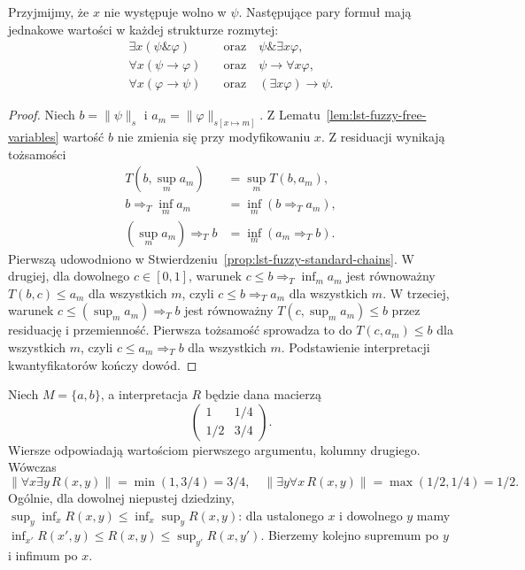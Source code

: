 \begin{stwierdzenie}
\label{prop:lst-fuzzy-quantifier-laws}
Przyjmijmy, że $x$ nie występuje wolno w $\psi$.
Następujące pary formuł mają jednakowe wartości
w każdej strukturze rozmytej:
\begin{align*}
 \exists x(\psi\mathbin{\&}\varphi)
 &\quad\text{oraz}\quad \psi\mathbin{\&}\exists x\varphi,\\
 \forall x(\psi\to\varphi)
 &\quad\text{oraz}\quad \psi\to\forall x\varphi,\\
 \forall x(\varphi\to\psi)
 &\quad\text{oraz}\quad (\exists x\varphi)\to\psi.
\end{align*}
\end{stwierdzenie}
\begin{proof}
Niech $b=\|\psi\|_s$ i $a_m=\|\varphi\|_{s[x\mapsto m]}$.
Z Lematu~\ref{lem:lst-fuzzy-free-variables} wartość $b$
nie zmienia się przy modyfikowaniu $x$. Z residuacji
wynikają tożsamości
\[
\begin{split}
 T(b,\sup_m a_m)&=\sup_m T(b,a_m),\\
 b\Rightarrow_T\inf_m a_m&=\inf_m(b\Rightarrow_T a_m),\\
 (\sup_m a_m)\Rightarrow_T b&=\inf_m(a_m\Rightarrow_T b).
\end{split}
\]
Pierwszą udowodniono w
Stwierdzeniu~\ref{prop:lst-fuzzy-standard-chains}.
W drugiej, dla dowolnego $c\in[0,1]$, warunek
$c\leq b\Rightarrow_T\inf_m a_m$ jest równoważny
$T(b,c)\leq a_m$ dla wszystkich $m$, czyli
$c\leq b\Rightarrow_T a_m$ dla wszystkich $m$.
W trzeciej, warunek
$c\leq(\sup_m a_m)\Rightarrow_T b$ jest równoważny
$T(c,\sup_m a_m)\leq b$ przez residuację i przemienność.
Pierwsza tożsamość sprowadza to do $T(c,a_m)\leq b$
dla wszystkich $m$, czyli $c\leq a_m\Rightarrow_T b$
dla wszystkich $m$. Podstawienie interpretacji
kwantyfikatorów kończy dowód.
\end{proof}

\begin{przyklad}
\label{ex:lst-fuzzy-quantifier-order}
Niech $M=\{a,b\}$, a interpretacja $R$ będzie dana macierzą
\[
 \begin{pmatrix}
 1 & 1/4\\
 1/2 & 3/4
 \end{pmatrix}.
\]
Wiersze odpowiadają wartościom pierwszego argumentu,
kolumny drugiego. Wówczas
\[
 \|\forall x\exists y\,R(x,y)\|=\min(1,3/4)=3/4,
 \quad
 \|\exists y\forall x\,R(x,y)\|=\max(1/2,1/4)=1/2.
\]
Ogólnie, dla dowolnej niepustej dziedziny,
$\sup_y\inf_x R(x,y)\leq\inf_x\sup_y R(x,y)$:
dla ustalonego $x$ i dowolnego $y$ mamy
$\inf_{x'}R(x',y)\leq R(x,y)\leq\sup_{y'}R(x,y')$.
Bierzemy kolejno supremum po $y$ i infimum po $x$.
\end{przyklad}

